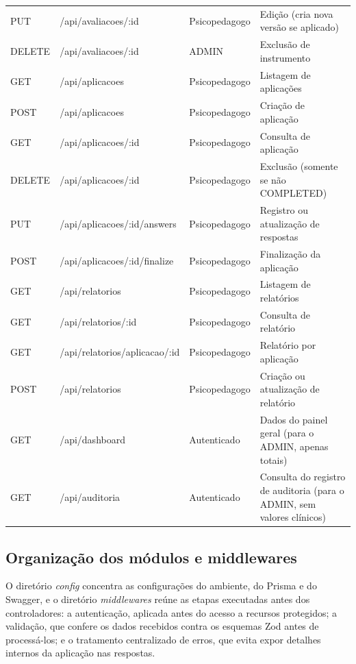 \begin{quadro}[H]
\begin{tabular}{p{1.5cm} p{6cm} p{2.5cm} p{4.5cm}}
PUT  & /api/avaliacoes/:id & Psicopedagogo & Edição (cria nova versão se aplicado) \\
DELETE & /api/avaliacoes/:id & ADMIN & Exclusão de instrumento \\
\hline
GET  & /api/aplicacoes & Psicopedagogo & Listagem de aplicações \\
POST & /api/aplicacoes & Psicopedagogo & Criação de aplicação \\
GET  & /api/aplicacoes/:id & Psicopedagogo & Consulta de aplicação \\
DELETE & /api/aplicacoes/:id & Psicopedagogo & Exclusão (somente se não COMPLETED) \\
PUT  & /api/aplicacoes/:id/answers & Psicopedagogo & Registro ou atualização de respostas \\
POST & /api/aplicacoes/:id/finalize & Psicopedagogo & Finalização da aplicação \\
\hline
GET  & /api/relatorios & Psicopedagogo & Listagem de relatórios \\
GET  & /api/relatorios/:id & Psicopedagogo & Consulta de relatório \\
GET  & /api/relatorios/aplicacao/:id & Psicopedagogo & Relatório por aplicação \\
POST & /api/relatorios & Psicopedagogo & Criação ou atualização de relatório \\
\hline
GET  & /api/dashboard & Autenticado & Dados do painel geral (para o ADMIN, apenas totais) \\
GET  & /api/auditoria & Autenticado & Consulta do registro de auditoria (para o ADMIN, sem valores clínicos) \\
\hline
\end{tabular}
\label{qua:rotas_api}
\end{quadro}

\subsection{Organização dos módulos e middlewares}

O diretório \textit{config} concentra as configurações do ambiente, do Prisma e do Swagger, e o diretório \textit{middlewares} reúne as etapas executadas antes dos controladores: a autenticação, aplicada antes do acesso a recursos protegidos; a validação, que confere os dados recebidos contra os esquemas Zod antes de processá-los; e o tratamento centralizado de erros, que evita expor detalhes internos da aplicação nas respostas.


